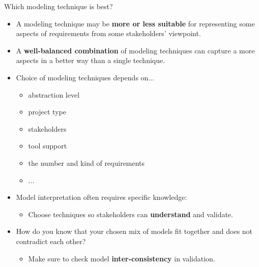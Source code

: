 
\begin{Slide}{Which modeling technique is best? }

\begin{itemize}
\item A modeling technique may be \textbf{more or less suitable} for representing some aspects of requirements from some stakeholders' viewpoint.

\item A \textbf{well-balanced combination} of modeling techniques can capture a more aspects in a better way than a single technique.

\item Choice of modeling techniques depends on...
\begin{itemize}
\item abstraction level
\item project type
\item stakeholders
\item tool support
\item the number and kind of requirements
\item ...

\end{itemize}
\item Model interpretation often requires specific knowledge: 
\begin{itemize}
\item Choose techniques so stakeholders can \textbf{understand} and validate.

\end{itemize}
\item How do you know that your chosen mix of models fit together and does not contradict each other?
\begin{itemize}
\item Make sure to check model \textbf{inter-consistency} in validation.

\end{itemize}
\end{itemize}
\end{Slide}